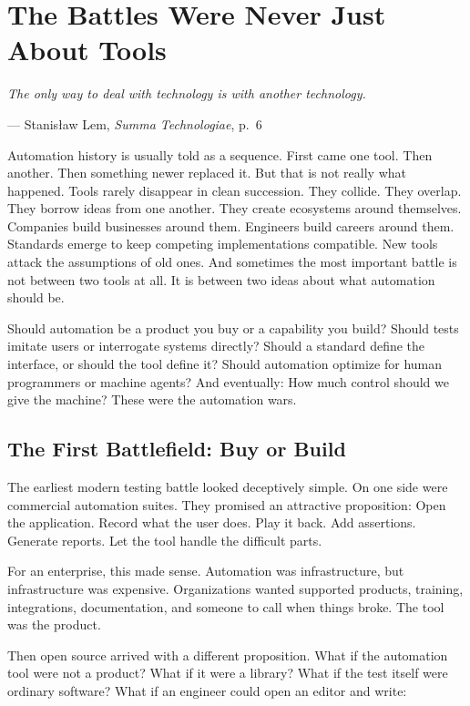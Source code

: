 \documentclass[11pt,twoside]{book}
\providecommand{\epigraphlem}[2]{%
  \begin{flushright}\begin{minipage}{0.72\textwidth}\raggedleft
  \itshape #1\par\vspace{0.4em}\normalfont\small --- #2
  \end{minipage}\end{flushright}\vspace{1.2em}}
\begin{document}
\chapter{The Battles Were Never Just About Tools}

\epigraphlem{The only way to deal with technology is with another technology.}{Stanisław Lem, \textit{Summa Technologiae}, p.~6}


Automation history is usually told as a sequence.
First came one tool.
Then another.
Then something newer replaced it.
But that is not really what happened.
Tools rarely disappear in clean succession.
They collide.
They overlap.
They borrow ideas from one another. They create ecosystems around themselves. Companies build businesses around them. Engineers build careers around them. Standards emerge to keep competing implementations compatible. New tools attack the assumptions of old ones.
And sometimes the most important battle is not between two tools at all.
It is between two ideas about what automation should be.

Should automation be a product you buy or a capability you build?
Should tests imitate users or interrogate systems directly?
Should a standard define the interface, or should the tool define it?
Should automation optimize for human programmers or machine agents?
And eventually:
How much control should we give the machine?
These were the automation wars.

\section*{The First Battlefield: Buy or Build}

The earliest modern testing battle looked deceptively simple.
On one side were commercial automation suites.
They promised an attractive proposition:
Open the application.
Record what the user does.
Play it back.
Add assertions.
Generate reports.
Let the tool handle the difficult parts.

For an enterprise, this made sense.
Automation was infrastructure, but infrastructure was expensive. Organizations wanted supported products, training, integrations, documentation, and someone to call when things broke.
The tool was the product.

Then open source arrived with a different proposition.
What if the automation tool were not a product?
What if it were a library?
What if the test itself were ordinary software?
What if an engineer could open an editor and write:
\end{document}
